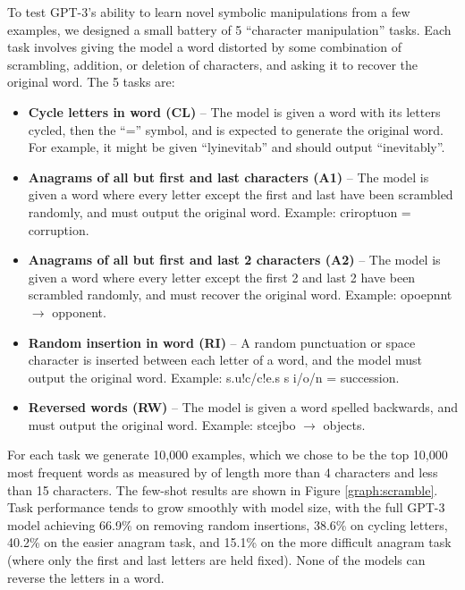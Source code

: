
To test GPT-3's ability to learn novel symbolic manipulations from a few examples, we designed a small battery of 5 ``character manipulation'' tasks.  Each task involves giving the model a word distorted by some combination of scrambling, addition, or deletion of characters, and asking it to recover the original word.  The 5 tasks are:




\begin{itemize}
    \item \textbf{Cycle letters in word (CL)} -- The model is given a word with its letters cycled, then the ``='' symbol, and is expected to generate the original word.  For example, it might be given ``lyinevitab'' and should output ``inevitably''.
    \item \textbf{Anagrams of all but first and last characters (A1)} -- The model is given a word where every letter except the first and last have been scrambled randomly, and must output the original word.  Example: criroptuon = corruption.
    \item \textbf{Anagrams of all but first and last 2 characters (A2)} -- The model is given a word where every letter except the first 2 and last 2 have been scrambled randomly, and must recover the original word.  Example: opoepnnt $\to$ opponent.
    \item \textbf{Random insertion in word (RI)} -- A random punctuation or space character is inserted between each letter of a word, and the model must output the original word.  Example: s.u!c/c!e.s s i/o/n = succession.
    \item \textbf{Reversed words (RW)} -- The model is given a word spelled backwards, and must output the original word.  Example: stcejbo $\to$ objects.
\end{itemize}

For each task we generate 10,000 examples, which we chose to be the top 10,000 most frequent words as measured by \cite{norvig2009ngram} of length more than 4 characters and less than 15 characters. The few-shot results are shown in Figure \ref{graph:scramble}.  Task performance tends to grow smoothly with model size, with the full GPT-3 model achieving 66.9\% on removing random insertions, 38.6\% on cycling letters, 40.2\% on the easier anagram task, and 15.1\% on the more difficult anagram task (where only the first and last letters are held fixed).  None of the models can reverse the letters in a word. 

